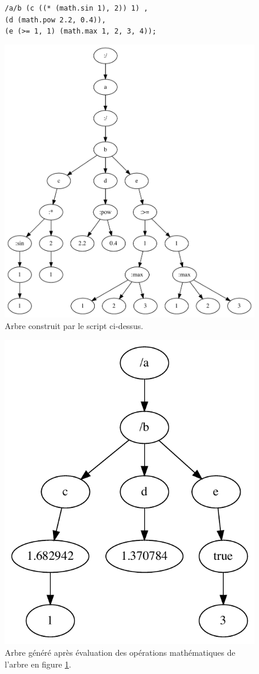 \documentclass{article}
\newcommand{\code}	[2][0.9]		{\vspace{0mm}\begin{center}\colorbox{mygrey}{
							\begin{minipage}[t]{#1\columnwidth} 
							{\small \texttt{#2}}
							\end{minipage}}\end{center}}
\newcommand{\ulb}		{\hspace*{4mm}}
\begin{document}
\begin{figure}[htbp]
\code{/a/b 	(c ((* (math.sin 1), 2)) 1) ,\\
\ulb		(d (math.pow 2.2, 0.4)),\\
\ulb		(e (>= 1, 1) (math.max 1, 2, 3, 4));}
\begin{center}
\includegraphics[width=1\columnwidth]{tree/sample3}
\caption{Arbre construit par le script ci-dessus.}
\label{parsesample2}
\end{center}
\end{figure}

\begin{figure}[htbp]
\begin{center}
\includegraphics[width=0.5\columnwidth]{eval/sample3}
\caption{Arbre généré après évaluation des opérations mathématiques de l'arbre en figure \ref{parsesample2}.}
\label{treesample2}
\end{center}
\end{figure}
\end{document}
